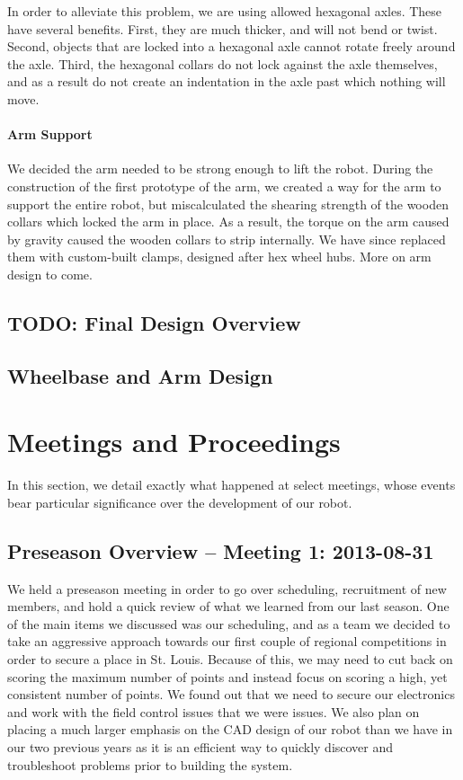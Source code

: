 \documentclass{article}
\begin{document}
In order to alleviate this problem, we are using allowed hexagonal axles. These have several benefits. First, they are much thicker, and will not bend or twist. Second, objects that are locked into a hexagonal axle cannot rotate freely around the axle. Third, the hexagonal collars do not lock against the axle themselves, and as a result do not create an indentation in the axle past which nothing will move. 

\paragraph{Arm Support} We decided the arm needed to be strong enough to lift the robot. During the construction of the first prototype of the arm, we created a way for the arm to support the entire robot, but miscalculated the shearing strength of the wooden collars which locked the arm in place. As a result, the torque on the arm caused by gravity caused the wooden collars to strip internally. We have since replaced them with custom-built clamps, designed after hex wheel hubs. More on arm design to come.

\newpage \subsection{TODO: Final Design Overview}

\newpage \subsection{Wheelbase and Arm Design}

\newpage \section{Meetings and Proceedings}
In this section, we detail exactly what happened at select meetings, whose events bear particular significance over the development of our robot.

\subsection{Preseason Overview -- Meeting 1: 2013-08-31}
We held a preseason meeting in order to go over scheduling, recruitment of new members, and hold a quick review of what we learned from our last season. One of the main items we discussed was our scheduling, and as a team we decided to take an aggressive approach towards our first couple of regional competitions in order to secure a place in St. Louis. Because of this, we may need to cut back on scoring the maximum number of points and instead focus on scoring a high, yet consistent number of points. We found out that we need to secure our electronics and work with the field control issues that we were issues. We also plan on placing a much larger emphasis on the CAD design of our robot than we have in our two previous years as it is an efficient way to quickly discover and troubleshoot problems prior to building the system. 
\end{document}
